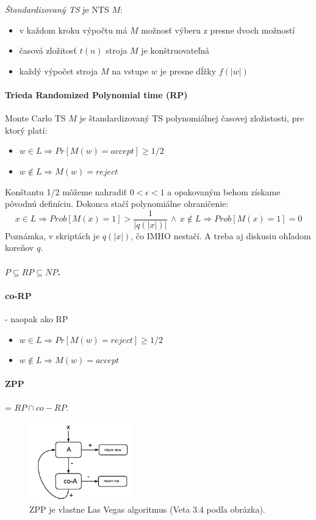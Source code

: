 \documentclass[12pt,a4paper]{article}
\begin{document}
\emph{Štandardizovaný TS} je NTS $M$: 
  \begin{itemize} 
    \item v každom kroku výpočtu má $M$ možnosť výberu z presne dvoch možností
    \item časová zložitosť $t(n)$ stroja $M$ je konštruovateľná
    \item každý výpočet stroja $M$ na vstupe $w$ je presne dĺžky $f(|w|)$ 
  \end{itemize}
  
\paragraph{Trieda Randomized Polynomial time (RP)}
Monte Carlo TS $M$ je štandardizovaný TS polynomiálnej časovej zložistosti, pre ktorý platí:  
\begin{itemize} 
  \item $w \in L \Rightarrow Pr[M(w) = accept] \geq 1/2$
  \item $w \not\in L \Rightarrow M(w) = reject$
\end{itemize}
Konštantu 1/2 môžeme nahradiť $0 < \epsilon < 1$ a opakovaným behom získame pôvodnú definíciu. Dokonca stačí polynomiálne ohraničenie: 
$$
x \in L \Rightarrow Prob[M(x) = 1] > \frac{1}{|q(|x|)|} \, \wedge \, x \not\in L \Rightarrow Prob[M(x) = 1] = 0
$$
Poznámka, v skriptách je $q(|x|)$, čo IMHO nestačí. A treba aj diskusiu ohľadom koreňov $q$.  

\paragraph{$P \subseteq RP \subseteq NP$.} 

\paragraph{co-RP} - naopak ako RP
\begin{itemize} 
  \item $w \in L \Rightarrow Pr[M(w) = reject] \geq 1/2$
  \item $w \not\in L \Rightarrow M(w) = accept$
\end{itemize}

\paragraph{ZPP} = $RP \cap co-RP$. 

\begin{figure}[H]
  \centering
  \includegraphics[width=0.4\textwidth]{zpp.png}
  \caption{ZPP je vlastne Las Vegas algoritmus (Veta 3.4 podľa obrázka).}
\end{figure}
\end{document}
